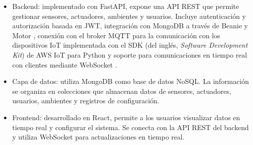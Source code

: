 \begin{itemize}
    \item Backend: implementado con FastAPI, expone una API REST que permite gestionar
          sensores, actuadores, ambientes y usuarios. Incluye autenticación y
          autorización basada en JWT, integración con MongoDB a través de Beanie
          \cite{BeaniODM} y Motor \cite{MotorMongoDB}, conexión con el broker MQTT para
          la comunicación con los dispositivos IoT implementada con el SDK (del inglés,
          \textit{Software Development Kit}) de AWS IoT para Python \cite{AWSIoTSDK} y
          soporte para comunicaciones en tiempo real con clientes mediante WebSocket
          \cite{FastAPIWebSockets}.

    \item Capa de datos: utiliza MongoDB como base de datos NoSQL. La información se
          organiza en colecciones que almacenan datos de sensores, actuadores, usuarios,
          ambientes y registros de configuración.

    \item Frontend: desarrollado en React, permite a los usuarios visualizar datos en
          tiempo real y configurar el sistema. Se conecta con la API REST del backend y
          utiliza WebSocket \cite{SocketIO} para actualizaciones en tiempo real.
\end{itemize}




